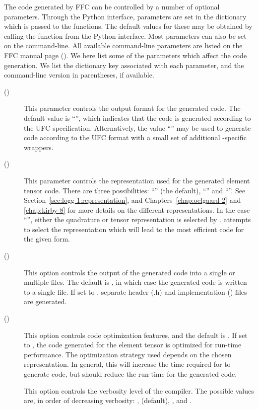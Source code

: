 The code generated by FFC can be controlled by a number of optional
parameters. Through the Python interface, parameters are set in the
dictionary  which is passed to the 
functions.  The default values for these may be obtained by calling
the function  from the Python interface. Most
parameters can also be set on the command-line.  All available
command-line parameters are listed on the FFC manual page (). We here list some of the parameters which affect the code
generation. We list the dictionary key associated with each parameter,
and the command-line version in parentheses, if available.
%
\begin{description}
  \item[ ()]
    This parameter controls the output format for the generated
    code. The default value is ``'', which indicates that the
    code is generated according to the UFC
    specification. Alternatively, the value ``'' may be
    used to generate code according to the UFC format with a small set
    of additional \dolfin{}-specific wrappers.
   \item[ ()] This parameter controls the representation used for the
    generated element tensor code. There are three possibilities:
    ``'' (the default), ``'' and
    ``''. See Section~\ref{sec:logg-1:representation}, and
    Chapters~\ref{chap:oelgaard-2} and \ref{chap:kirby-8} for more
    details on the different representations. In the case
    ``'', either the quadrature or tensor representation is
    selected by \ffc{}. \ffc{} attempts to select the representation
    which will lead to the most efficient code for the given form.
  \item[ ()] This option controls the output of the
    generated code into a single or multiple files. The default is
    , in which case the generated code is written to a single
    file. If set to , separate header (.h) and implementation
    () files are generated.
  \item[ ()] This option controls code optimization features,
    and the default is . If set to , the code
    generated for the element tensor is optimized for run-time performance.
    The optimization strategy used depends on
    the chosen representation. In general, this will increase the
    time required for \ffc{} to generate code, but should reduce the run-time
    for the generated code.
  \item[] This option controls the verbosity level of the
    compiler. The possible values are, in order of decreasing
    verbosity: ,  (default), ,  and .
\end{description}

